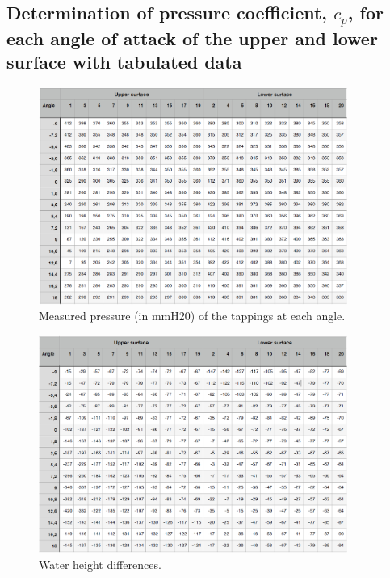 \documentclass[11pt]{article}
\begin{document}
\subsection*{Determination of pressure coefficient, $c_p$, for each angle of attack of the upper and lower surface with tabulated data}
\begin{figure}[H]
  \centering
  \includegraphics[width=0.9\textwidth]{./img/diagram6.png}
  \caption{Measured pressure (in mmH20) of the tappings at each angle.}
\end{figure}
\begin{figure}[H]
  \centering
  \includegraphics[width=0.9\textwidth]{./img/diagram7.png}
  \caption{Water height differences.}
\end{figure}
\end{document}
